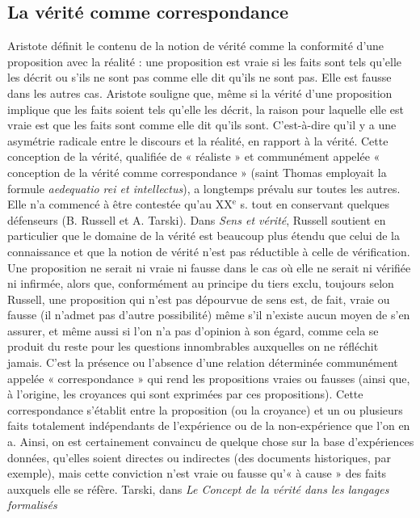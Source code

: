 \subsection{La vérité comme correspondance}
Aristote définit le contenu de la notion
de vérité comme la conformité d’une proposition
avec la réalité : une proposition
est vraie si les faits sont tels qu'elle les
décrit ou s’ils ne sont pas comme elle dit
qu'ils ne sont pas. Elle est fausse dans les
autres cas. Aristote souligne que, même si
la vérité d’une proposition implique que
les faits soient tels qu’elle les décrit, la raison
pour laquelle elle est vraie est que les
faits sont comme elle dit qu’ils sont. C’est-à-dire
qu’il y a une asymétrie radicale
entre le discours et la réalité, en rapport
à la vérité. Cette conception de la vérité,
qualifiée de « réaliste » et communément
appelée « conception de la vérité
comme correspondance » (saint Thomas
employait la formule {\it aedequatio rei et
intellectus}), a longtemps prévalu sur
toutes les autres. Elle n’a commencé à
être contestée qu’au {\footnotesize XX}$^\text{e}$ s.
tout en conservant
quelques défenseurs (B. Russell et
A. Tarski). Dans {\it Sens et vérité}, Russell
soutient en particulier que le domaine de
la vérité est beaucoup plus étendu que
celui de la connaissance et que la notion
de vérité n’est pas réductible à celle de
vérification. Une proposition ne serait ni
vraie ni fausse dans le cas où elle ne serait
ni vérifiée ni infirmée, alors que, conformément
au principe du tiers exclu, toujours
selon Russell, une proposition qui
n’est pas dépourvue de sens est, de fait,
%
vraie ou fausse (il n’admet pas d’autre
possibilité) même s’il n’existe aucun
moyen de s’en assurer, et même aussi si
l’on n’a pas d’opinion à son égard, comme
cela se produit du reste pour les questions
innombrables auxquelles on ne réfléchit
jamais. C’est la présence ou l’absence
d’une relation déterminée communément
appelée « correspondance » qui rend les
propositions vraies ou fausses (ainsi que,
à l’origine, les croyances qui sont exprimées
par ces propositions). Cette correspondance
s'établit entre la proposition
(ou la croyance) et un ou plusieurs faits
totalement indépendants de l'expérience
ou de la non-expérience que l’on en a.
Ainsi, on est certainement convaincu de
quelque chose sur la base d’expériences
données, qu’elles soient directes ou indirectes
(des documents historiques, par
exemple), mais cette conviction n’est
vraie ou fausse qu’« à cause » des faits
auxquels elle se réfère. Tarski, dans {\it Le
Concept de la vérité dans les langages formalisés}
